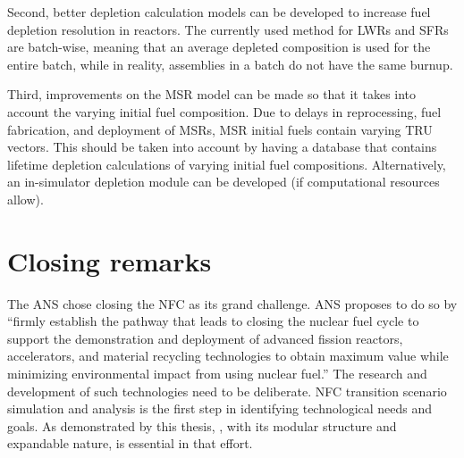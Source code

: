 Second, better depletion calculation models can be developed to increase
fuel depletion resolution in reactors. The currently used method for
\glspl{LWR} and \glspl{SFR} are batch-wise, meaning that an average
depleted composition is used for the entire batch, while in reality,
assemblies in a batch do not have the same burnup.

Third, improvements on the \gls{MSR} model can be made so that it
takes into account the varying initial fuel composition. Due to delays
in reprocessing, fuel fabrication, and deployment of \glspl{MSR}, \gls{MSR}
initial fuels contain varying \gls{TRU} vectors. This should be taken into
account by having a database that contains lifetime depletion calculations
of varying initial fuel compositions. Alternatively, an in-simulator
depletion module can be developed (if computational resources allow).


\section{Closing remarks}
The \gls{ANS} chose closing the \gls{NFC} as its grand challenge. \gls{ANS}
proposes to do so by ``firmly establish the pathway that leads to closing
the nuclear fuel cycle to support the demonstration and deployment of
advanced fission reactors, accelerators, and material recycling technologies
to obtain maximum value while minimizing environmental impact 
from using nuclear fuel.'' The research and development of such technologies
need to be deliberate. \gls{NFC} transition scenario simulation and 
analysis is the first step in identifying technological needs
and goals.  As demonstrated by this thesis, \Cyclus, with its
modular structure and expandable nature, is essential in that effort.

